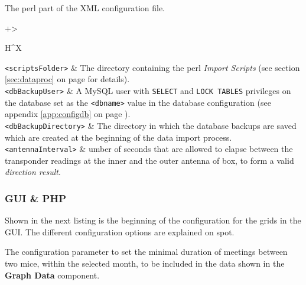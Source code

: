 \documentclass[a4paper,10pt,twoside,titlepage,headings=small,bibliography=totocnumbered,headsepline]{scrartcl}
\begin{document}
\begin{appendix}
The perl part of the XML configuration file.



\begin{center} 
\renewcommand\arraystretch{2}
\begin{tabularx}{\textwidth}{+>{\raggedright\arraybackslash}H^X}
 \hline
\lstinline|<scriptsFolder>|	&	The directory containing the perl \textit{Import Scripts} (see section \ref{sec:dataproc} on page \pageref{sec:dataproc} for details). \\ 
\lstinline|<dbBackupUser>|	&	A MySQL user with \lstinline|SELECT| and \lstinline|LOCK TABLES| privileges on the database set as the \lstinline|<dbname>| value in the database configuration (see appendix \ref{app:configdb} on page \pageref{app:configdb}). \\ 
\lstinline|<dbBackupDirectory>|	&	The directory in which the database backups are saved which are created at the beginning of the data import process. \\ 
\lstinline|<antennaInterval>|	&	 umber of seconds that are allowed to elapse between the transponder readings at the inner and the outer antenna of box, to form a valid \textit{direction result}.\\ 
\hline
\end{tabularx}
\label{tab:perl_config}
\end{center} 

\subsubsection{GUI \& PHP}
\label{app:configfrontend}




Shown in the next listing is the beginning of the configuration for the grids in the GUI. The different configuration options are explained on spot.



The configuration parameter to set the minimal duration of meetings between two mice, within the selected month, to be included in the data shown in the \textbf{Graph Data} component. 


\end{appendix}
\end{document}

